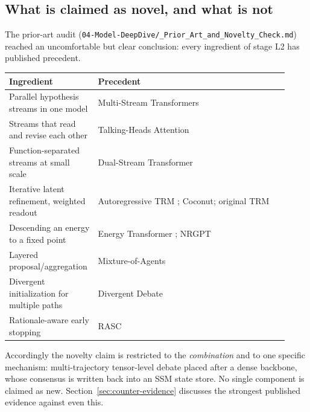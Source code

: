 \documentclass[11pt,a4paper]{article}
\theoremstyle{plain}
\theoremstyle{definition}
\theoremstyle{remark}
\begin{document}
\subsection{What is claimed as novel, and what is not}

\noindent
The prior-art audit (\texttt{04-Model-DeepDive/\_Prior\_Art\_and\_Novelty\_Check.md})
reached an uncomfortable but clear conclusion: every ingredient of stage L2 has
published precedent.

\begin{center}
\small
\begin{tabular}{@{}>{\raggedright\arraybackslash}p{0.26\linewidth}>{\raggedright\arraybackslash}p{0.66\linewidth}@{}}
\toprule
\rowcolor{ekHeadBG}\color{white}\textbf{Ingredient} & \color{white}\textbf{Precedent} \\
\midrule
Parallel hypothesis streams in one model & Multi-Stream Transformers \cite{burtsev2021multistream} \\
Streams that read and revise each other & Talking-Heads Attention \cite{shazeer2020talkingheads} \\
Function-separated streams at small scale & Dual-Stream Transformer \cite{kerce2026dualstream} \\
Iterative latent refinement, weighted readout & Autoregressive TRM \cite{rauba2026trm}; Coconut; original TRM \cite{jolicoeur2025trm} \\
Descending an energy to a fixed point & Energy Transformer \cite{energytransformer2023}; NRGPT \cite{nrgpt2025} \\
Layered proposal/aggregation & Mixture-of-Agents \cite{wang2025moa} \\
Divergent initialization for multiple paths & Divergent Debate \cite{liang2023divergent} \\
Rationale-aware early stopping & RASC \cite{wan2025rasc} \\
\bottomrule
\end{tabular}
\end{center}

\noindent
Accordingly the novelty claim is restricted to the \emph{combination} and to
one specific mechanism: multi-trajectory tensor-level debate placed after a
dense backbone, whose consensus is written back into an SSM state store. No
single component is claimed as new. Section~\ref{sec:counter-evidence}
discusses the strongest published evidence against even this.

\end{document}
